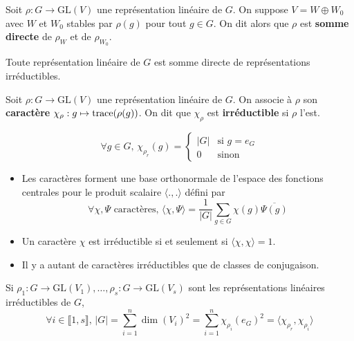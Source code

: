 	\begin{definition}
		Soit $\rho : G \rightarrow \mathrm{GL}(V)$ une représentation linéaire de $G$. On suppose $V = W \oplus W_0$ avec $W$ et $W_0$ stables par $\rho(g)$ pour tout $g \in G$. On dit alors que $\rho$ est \textbf{somme directe} de $\rho_W$ et de $\rho_{W_0}$.
	\end{definition}

	\begin{theorem}[Maschke]
		Toute représentation linéaire de $G$ est somme directe de représentations irréductibles.
	\end{theorem}


	\begin{definition}
		Soit $\rho : G \rightarrow \mathrm{GL}(V)$ une représentation linéaire de $G$. On associe à $\rho$ son \textbf{caractère} $\chi_\rho : g \mapsto \operatorname{trace}(\rho(g))$. On dit que $\chi_{\rho}$ est \textbf{irréductible} si $\rho$ l'est.
	\end{definition}


	\begin{example}
		\[ \forall g \in G, \, \chi_{\rho_r}(g) = \begin{cases} |G| &\text{si } g = e_G \\ 0 &\text{sinon} \end{cases} \]
	\end{example}


	\begin{theorem}
		\begin{itemize}
			\item Les caractères forment une base orthonormale de l'espace des fonctions centrales pour le produit scalaire $\langle ., . \rangle$ défini par
			\[ \forall \chi, \Psi \text{ caractères}, \, \langle \chi, \Psi \rangle = \frac{1}{|G|} \sum_{g \in G} \chi(g) \overline{\Psi(g)} \]
			\item Un caractère $\chi$ est irréductible si et seulement si $\langle \chi, \chi \rangle = 1$.
			\item Il y a autant de caractères irréductibles que de classes de conjugaison.
		\end{itemize}
	\end{theorem}

	\begin{theorem}
		Si $\rho_1 : G \rightarrow \mathrm{GL}(V_1), \dots, \rho_s : G \rightarrow \mathrm{GL}(V_s)$ sont les représentations linéaires irréductibles de $G$,
		\[ \forall i \in \llbracket 1, s \rrbracket, \, |G| = \sum_{i=1}^n \dim(V_i)^2 = \sum_{i=1}^n \chi_{\rho_i}(e_G)^2 = \langle \chi_{\rho_r}, \chi_{\rho_i} \rangle \]
	\end{theorem}

